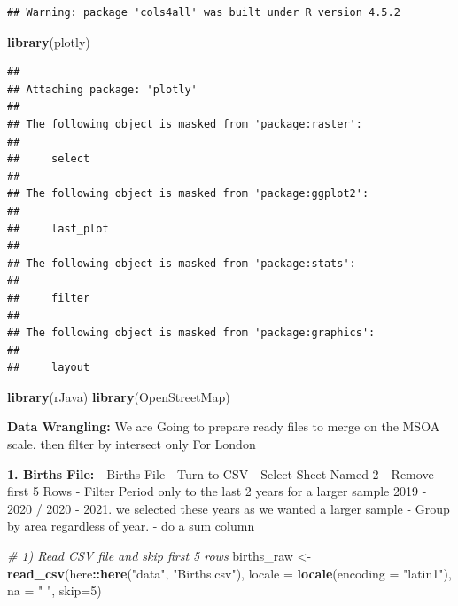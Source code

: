 \documentclass[
]{article}
\newenvironment{Shaded}{\begin{snugshade}}{\end{snugshade}}
\newcommand{\AttributeTok}[1]{\textcolor[rgb]{0.13,0.29,0.53}{#1}}
\newcommand{\CommentTok}[1]{\textcolor[rgb]{0.56,0.35,0.01}{\textit{#1}}}
\newcommand{\DecValTok}[1]{\textcolor[rgb]{0.00,0.00,0.81}{#1}}
\newcommand{\FunctionTok}[1]{\textcolor[rgb]{0.13,0.29,0.53}{\textbf{#1}}}
\newcommand{\NormalTok}[1]{#1}
\newcommand{\OtherTok}[1]{\textcolor[rgb]{0.56,0.35,0.01}{#1}}
\newcommand{\SpecialCharTok}[1]{\textcolor[rgb]{0.81,0.36,0.00}{\textbf{#1}}}
\newcommand{\StringTok}[1]{\textcolor[rgb]{0.31,0.60,0.02}{#1}}
\begin{document}
\begin{verbatim}
## Warning: package 'cols4all' was built under R version 4.5.2
\end{verbatim}

\begin{Shaded}
\begin{Highlighting}[]
\FunctionTok{library}\NormalTok{(plotly)}
\end{Highlighting}
\end{Shaded}

\begin{verbatim}
## 
## Attaching package: 'plotly'
## 
## The following object is masked from 'package:raster':
## 
##     select
## 
## The following object is masked from 'package:ggplot2':
## 
##     last_plot
## 
## The following object is masked from 'package:stats':
## 
##     filter
## 
## The following object is masked from 'package:graphics':
## 
##     layout
\end{verbatim}

\begin{Shaded}
\begin{Highlighting}[]
\FunctionTok{library}\NormalTok{(rJava)}
\FunctionTok{library}\NormalTok{(OpenStreetMap)}
\end{Highlighting}
\end{Shaded}

\textbf{Data Wrangling:} We are Going to prepare ready files to merge on
the MSOA scale. then filter by intersect only For London

\textbf{1. Births File:} - Births File - Turn to CSV - Select Sheet
Named 2 - Remove first 5 Rows - Filter Period only to the last 2 years
for a larger sample 2019 - 2020 / 2020 - 2021. we selected these years
as we wanted a larger sample - Group by area regardless of year. - do a
sum column

\begin{Shaded}
\begin{Highlighting}[]
\CommentTok{\# 1) Read CSV file and skip first 5 rows }
\NormalTok{births\_raw }\OtherTok{\textless{}{-}} \FunctionTok{read\_csv}\NormalTok{(here}\SpecialCharTok{::}\FunctionTok{here}\NormalTok{(}\StringTok{"data"}\NormalTok{, }\StringTok{"Births.csv"}\NormalTok{),}
                       \AttributeTok{locale =} \FunctionTok{locale}\NormalTok{(}\AttributeTok{encoding =} \StringTok{"latin1"}\NormalTok{),}
                       \AttributeTok{na =} \StringTok{" "}\NormalTok{, }\AttributeTok{skip=}\DecValTok{5}\NormalTok{)}
\end{Highlighting}
\end{Shaded}
\end{document}

